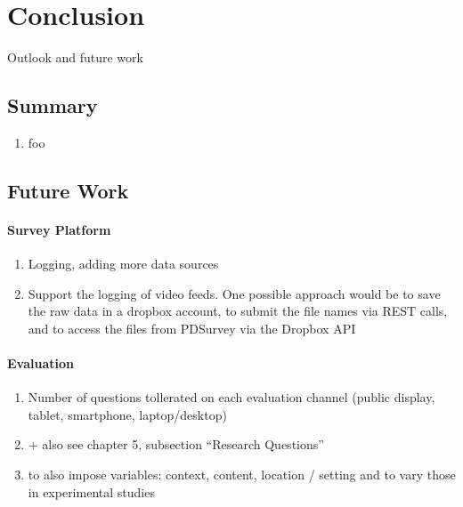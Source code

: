 \section{Conclusion}

Outlook and future work



\subsection{Summary}

\begin{enumerate}
\item foo
\end{enumerate}


\subsection{Future Work}


\paragraph{Survey Platform}

	\begin{enumerate}
	\item Logging, adding more data sources
	\item Support the logging of video feeds. One possible approach would be to save the raw data in a dropbox account, to submit the file names via REST calls, and to access the files from PDSurvey via the Dropbox API
	\end{enumerate}


\paragraph{Evaluation}

	\begin{enumerate}
	\item Number of questions tollerated on each evaluation channel (public display, tablet, smartphone, laptop/desktop)
	\item + also see chapter 5, subsection ``Research Questions'' 
	\item to also impose variables: context, content, location / setting and to vary those in experimental studies
	\end{enumerate}

